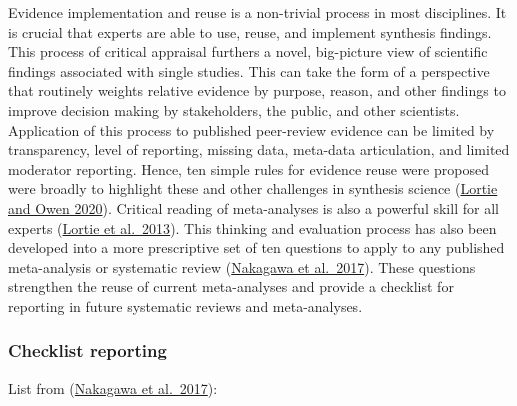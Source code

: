 \documentclass[
]{book}
\begin{document}
Evidence implementation and reuse is a non-trivial process in most disciplines. It is crucial that experts are able to use, reuse, and implement synthesis findings. This process of critical appraisal furthers a novel, big-picture view of scientific findings associated with single studies. This can take the form of a perspective that routinely weights relative evidence by purpose, reason, and other findings to improve decision making by stakeholders, the public, and other scientists. Application of this process to published peer-review evidence can be limited by transparency, level of reporting, missing data, meta-data articulation, and limited moderator reporting. Hence, ten simple rules for evidence reuse were proposed were broadly to highlight these and other challenges in synthesis science (\href{https://www.facetsjournal.com/doi/10.1139/facets-2020-0021}{Lortie and Owen 2020}). Critical reading of meta-analyses is also a powerful skill for all experts (\href{https://onlinelibrary.wiley.com/doi/10.1002/jrsm.1109}{Lortie et al.~2013}). This thinking and evaluation process has also been developed into a more prescriptive set of ten questions to apply to any published meta-analysis or systematic review (\href{https://bmcbiol.biomedcentral.com/articles/10.1186/s12915-017-0357-7}{Nakagawa et al.~2017}). These questions strengthen the reuse of current meta-analyses and provide a checklist for reporting in future systematic reviews and meta-analyses.

\hypertarget{checklist-reporting}{%
\subsubsection*{Checklist reporting}\label{checklist-reporting}}

List from (\href{https://bmcbiol.biomedcentral.com/articles/10.1186/s12915-017-0357-7}{Nakagawa et al.~2017}):
\end{document}
